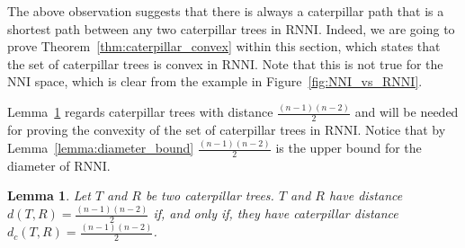 \documentclass{amsart}
\newcommand{\nni}{\mathrm{NNI}}
\newcommand{\rnni}{\mathrm{RNNI}}
\newtheorem{lemma}[definition]{Lemma}
\begin{document}
The above observation suggests that there is always a caterpillar path that is a shortest path between any two caterpillar trees in $\rnni$.
Indeed, we are going to prove Theorem~\ref{thm:caterpillar_convex} within this section, which states that the set of caterpillar trees is convex in $\rnni$.
Note that this is not true for the $\nni$ space, which is clear from the example in Figure~\ref{fig:NNI_vs_RNNI}.

Lemma~\ref{lemma:caterpillar_dist=diameter} regards caterpillar trees with distance $\frac{(n-1)(n-2)}{2}$ and will be needed for proving the convexity of the set of caterpillar trees in $\rnni$.
Notice that by Lemma~\ref{lemma:diameter_bound} $\frac{(n-1)(n-2)}{2}$ is the upper bound for the diameter of $\rnni$.

\begin{lemma}
    Let $T$ and $R$ be two caterpillar trees.
    $T$ and $R$ have distance $d(T,R) = \frac{(n-1)(n-2)}{2}$ if, and only if, they have caterpillar distance $d_c(T,R) = \frac{(n-1)(n-2)}{2}$.
    \label{lemma:caterpillar_dist=diameter}
\end{lemma}
\end{document}

